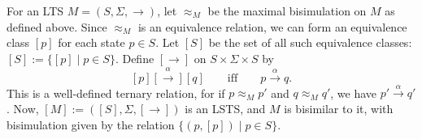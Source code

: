 \documentclass[12pt]{article}
\begin{document}
For an LTS $M=(S,\Sigma,\rightarrow)$, let $\approx_M$ be the maximal bisimulation on $M$ as defined above.  Since $\approx_M$ is an equivalence relation, we can form an equivalence class $[p]$ for each state $p\in S$.  Let $[S]$ be the set of all such equivalence classes: $[S]:=\lbrace [p]\mid p\in S\rbrace$.  Define $[\rightarrow]$ on $S\times \Sigma \times S$ by $$[p] \stackrel{\alpha}{[\rightarrow]} [q] \qquad \mbox{iff}  \qquad p\stackrel{\alpha}{\rightarrow} q.$$  This is a well-defined ternary relation, for if $p\approx_M p'$ and $q\approx_M q'$, we have $p'\stackrel{\alpha}{\rightarrow} q'$.  Now, $[M]:=([S],\Sigma,[\rightarrow])$ is an LSTS, and $M$ is bisimilar to it, with bisimulation given by the relation $\lbrace (p,[p])\mid p\in S\rbrace$.

\end{document}
